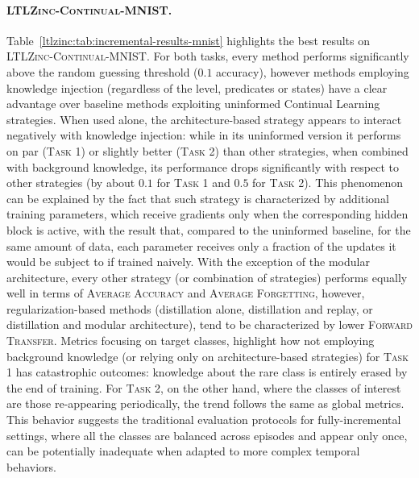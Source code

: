 \paragraph{\textsc{LTLZinc-Continual-MNIST}.} Table~\ref{ltlzinc:tab:incremental-results-mnist} highlights the best results on \textsc{LTLZinc-Continual-MNIST}. For both tasks, every method performs significantly above the random guessing threshold ($0.1$ accuracy), however methods employing knowledge injection (regardless of the level, predicates or states) have a clear advantage over baseline methods exploiting uninformed Continual Learning strategies. When used alone, the architecture-based strategy appears to interact negatively with knowledge injection: while in its uninformed version it performs on par (\textsc{Task 1}) or slightly better (\textsc{Task 2}) than other strategies, when combined with background knowledge, its performance drops significantly with respect to other strategies (by about $0.1$ for \textsc{Task 1} and $0.5$ for \textsc{Task 2}). This phenomenon can be explained by the fact that such strategy is characterized by additional training parameters, which receive gradients only when the corresponding hidden block is active, with the result that, compared to the uninformed baseline, for the same amount of data, each parameter receives only a fraction of the updates it would be subject to if trained naively.
With the exception of the modular architecture, every other strategy (or combination of strategies) performs equally well in terms of \textsc{Average Accuracy} and \textsc{Average Forgetting}, however, regularization-based methods (distillation alone, distillation and replay, or distillation and modular architecture), tend to be characterized by lower \textsc{Forward Transfer}.
Metrics focusing on target classes, highlight how not employing background knowledge (or relying only on architecture-based strategies) for \textsc{Task 1} has catastrophic outcomes: knowledge about the rare class is entirely erased by the end of training. For \textsc{Task 2}, on the other hand, where the classes of interest are those re-appearing periodically, the trend follows the same as global metrics. This behavior suggests the traditional evaluation protocols for fully-incremental settings, where all the classes are balanced across episodes and appear only once, can be potentially inadequate when adapted to more complex temporal behaviors.

